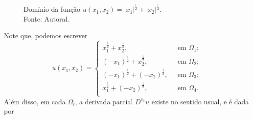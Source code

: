 \documentclass[a4paper, 11pt]{book}
\theoremstyle{definition}
\begin{document}
\begin{ex}
\begin{figure}[H]
        \caption{Domínio da função $u(x_1,x_2) = |x_1|^{\frac{1}{2}} + |x_2|^{\frac{1}{2}}$.\\
        Fonte: Autoral.}
        \label{fig:dominio}
    \end{figure}
    Note que, podemos escrever
    \begin{equation}
        u(x_1,x_2) =
        \left\{
            \begin{array}{lr}
                x_1^{\frac{1}{2}} + x_2^{\frac{1}{2}}, &\;\text{ em } \Omega_1;\\
                (-x_1)^{\frac{1}{2}} + x_2^{\frac{1}{2}}, &\;\text{ em } \Omega_2;\\
                (-x_1)^{\frac{1}{2}} + (-x_2)^{\frac{1}{2}}, &\;\text{ em } \Omega_3;\\
                x_1^{\frac{1}{2}} + (-x_2)^{\frac{1}{2}}, &\;\text{ em } \Omega_4.\\
            \end{array}
        \right.
    \end{equation}
    Além disso, em cada $\Omega_i$, a derivada parcial $D^{e_1}u$ existe no sentido usual, e é dada por

\end{ex}
\end{document}
